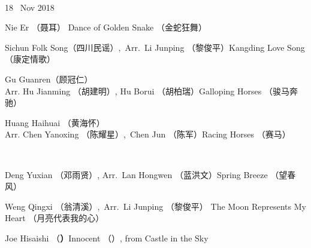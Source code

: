 \documentclass[letter,6pt,poets]{ConcProg}
\begin{document}
\begin{spacing}{1.0}
\begin{programme}{
\\  {\normalsize 18 ~Nov 2018}
}
\begin{part}[]
    \begin{composition}{Nie Er （聂耳）} {}{Dance of Golden Snake  （金蛇狂舞）}{}
    \end{composition}
    \begin{composition}{Sichun Folk Song（四川民谣）,\ Arr.\ Li Junping （黎俊平）}{}{Kangding Love Song  （康定情歌）}{}
    \end{composition}
    \begin{composition}{Gu Guanren（顾冠仁）\\ Arr. Hu Jianming （胡建明）, Hu Borui （胡柏瑞）}{}{Galloping Horses  （骏马奔驰）}{}
    \end{composition}
    \begin{composition}{Huang Haihuai （黄海怀）\\ Arr. Chen Yanoxing （陈耀星）,\  Chen Jun （陈军）}{}{Racing Horses  （赛马）}{}
    \end{composition}\\
    \begin{composition}{Deng Yuxian （邓雨贤）, Arr.\ Lan Hongwen （蓝洪文）}{}{Spring Breeze  （望春风）}{}
    \end{composition}
    \begin{composition}{Weng Qingxi （翁清溪）,\ Arr.\ Li Junping （黎俊平） }{}{The Moon Represents My Heart  （月亮代表我的心）}{}
    \end{composition}
    \begin{composition}{Joe Hisaishi （\textbf{）}}{}{Innocent （）, from Castle in the Sky }{}
                   {}{}
    \end{composition}
    
    



\end{part}
\end{programme}
\end{spacing}
\end{document}
